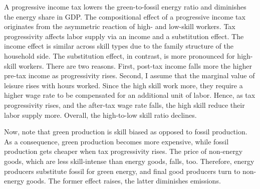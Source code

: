 A progressive income tax lowers the green-to-fossil energy ratio and diminishes the energy share in GDP. %
The compositional effect of a progressive income tax originates from the asymmetric reaction of high- and low-skill workers. 
Tax progressivity affects labor supply via an income and a substitution effect. 
The income effect is similar across skill types due to the family structure of the household side.
The substitution effect, in contrast, is more pronounced for high-skill workers.
There are two reasons. First, post-tax income falls more the higher pre-tax income as progressivity rises. 
Second,  I assume that the marginal value of leisure rises with hours worked. Since the high skill work more, they require a higher wage rate to be compensated for an additional unit of labor. Hence, as tax progressivity rises, and the after-tax wage rate falls, the high skill reduce their labor supply more.  %
Overall, the high-to-low skill ratio declines. 


Now, note that green production is skill biased as opposed to fossil production.
As a  consequence, green production becomes more expensive, while fossil production gets cheaper when tax progressivity rises. The price of non-energy goods, which are less skill-intense than energy goods, falls, too. Therefore, energy producers substitute fossil for green energy, and final good producers turn to non-energy goods. The former effect raises, the latter diminishes emissions.


